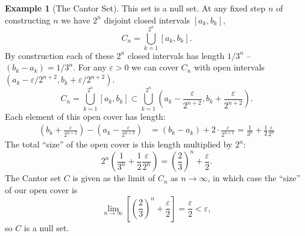 \documentclass{article}
\theoremstyle{definition}
\newtheorem{example}{Example}[section]
\begin{document}
\begin{example}[The Cantor Set]
		This set is a null set. At any fixed step $ n$ of constructing $ n $ we have $ 2^n $ disjoint closed intervals $ [a_k,b_k] ,$ 
		$$ C_n = \bigcup_{k=1}^{2^n}[a_k,b_k] .$$ By construction each of these $ 2^n $ closed intervals has length $ 1/3^n $ -- $ (b_k-a_k)=1/3^n $. For any $ \varepsilon > 0 $ we can cover $ C_n $ with open intervals $ (a_k-\varepsilon/2^{n+2}, b_k+\varepsilon/2^{n+2})  $.
		$$ C_n = \bigcup_{k=1}^{2^n}[a_k,b_k]\subset \bigcup_{k=1}^{2^n}\left(a_k-\frac{\varepsilon}{2^{n+2}},b_k+\frac{\varepsilon}{2^{n+2}}\right) .$$ Each element of this open cover has length: 
		\begin{align*}
			\left( b_k+\frac{\varepsilon}{2^{n+2}} \right)- \left(a_k-\frac{\varepsilon}{2^{n+2}}\right) & = (b_k-a_k) + 2\cdot \frac{\varepsilon}{2^{n+1}} = \frac{1}{3^n}+\frac{1}{2}\frac{\varepsilon}{2^n}
		\end{align*}
		The total ``size'' of the open cover is this length multiplied by $ 2^n $: 
		$$ 2^n\left(\frac{1}{3^n}+\frac{1}{2}\frac{\varepsilon}{2^n}\right) = \left(\frac{2}{3}\right)^n + \frac{\varepsilon}{2}.$$
		The Cantor set $ C $ is given as the limit of $ C_n $ as $ n\to\infty $, in which case the ``size'' of our open cover is 
		$$  \lim\limits_{n\to\infty}\left[ \left(\frac{2}{3}\right)^n + \frac{\varepsilon}{2}\right] = \frac{\varepsilon}{2} < \varepsilon,$$ so $ C $ is a null set. 
		

\end{example}
\end{document}
